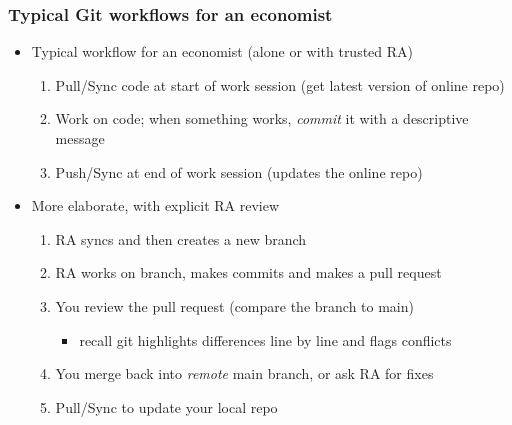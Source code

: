 \documentclass[aspectratio=169, 12pt]{beamer}
\begin{document}
\begin{frame}
\frametitle{Typical Git workflows for an economist}
\begin{itemize}
    \item Typical workflow for an economist {\color{gray}(alone or with trusted RA)}
    \begin{enumerate}
        \item Pull/Sync code at start of work session (get latest version of online repo)
        \item Work on code; when something works, {\it commit} it with a descriptive message
        \item Push/Sync at end of work session (updates the online repo)
    \end{enumerate}\vfill
    \item More elaborate, with explicit RA review
    \begin{enumerate}
        \item RA syncs and then creates a new branch
        \item RA works on branch, makes commits and makes a pull request
        \item You review the pull request (compare the branch to main)
        \begin{itemize}
            \item recall git highlights differences line by line and flags conflicts %
        \end{itemize}
        \item You merge back into {\it remote} main branch, or ask RA for fixes 
        \item Pull/Sync to update your local repo
    \end{enumerate} 
\end{itemize}
\end{frame}
\end{document}
